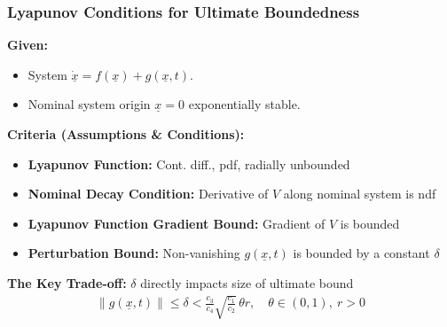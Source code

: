 \documentclass[student, noshadow, lsr, english, aspectratio=169, t]{ITR_LSR_slides}
\begin{document}
\begin{frame}
    \frametitle{Lyapunov Conditions for Ultimate Boundedness}

    \textbf{Given:}
    \begin{itemize}
        \item System $\dot{\underline{x}} = f(\underline{x}) + g(\underline{x}, t)$.
        \item Nominal system origin $\underline{x}=0$ exponentially stable.
    \end{itemize}
	\vspace{0.3cm}
	\textbf{Criteria (Assumptions \& Conditions):}
    \begin{itemize}
        \item \textbf{Lyapunov Function:} Cont. diff., pdf, radially unbounded
        \item \textbf{Nominal Decay Condition:} Derivative of $V$ along nominal system is ndf
        \item \textbf{Lyapunov Function Gradient Bound:} Gradient of $V$ is bounded
        \item \textbf{Perturbation Bound:} Non-vanishing $g(\underline{x}, t)$ is bounded by a constant $\delta$
    \end{itemize}
	\vspace{0.3cm}
    \textbf{The Key Trade-off:} $\delta$ directly impacts size of ultimate bound
    \begin{align*}
		\|g(\underline{x}, t)\| \leq \delta < \frac{c_3}{c_4} \sqrt{\frac{c_1}{c_2}}\, \theta r, \quad \theta \in (0,1),\ r > 0
	\end{align*}

\end{frame}
\end{document}
